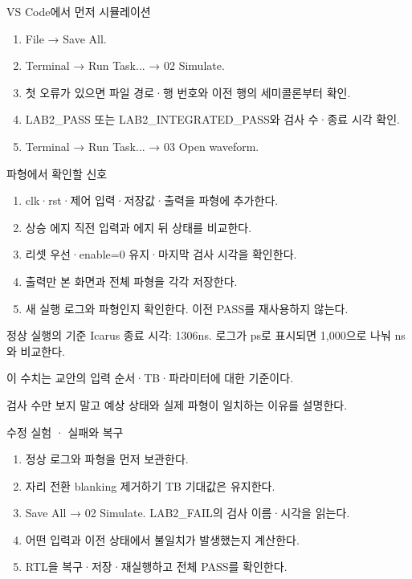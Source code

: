 \begin{frame}[label=simulation]{VS Code에서 먼저 시뮬레이션}
\small
\begin{enumerate}
\item File → Save All.
\item Terminal → Run Task... → 02 Simulate.
\item 첫 오류가 있으면 파일 경로·행 번호와 이전 행의 세미콜론부터 확인.
\item LAB2\_PASS 또는 LAB2\_INTEGRATED\_PASS와 검사 수·종료 시각 확인.
\item Terminal → Run Task... → 03 Open waveform.
\end{enumerate}
\end{frame}

\begin{frame}{파형에서 확인할 신호}
\small
\begin{enumerate}
\item clk·rst·제어 입력·저장값·출력을 파형에 추가한다.
\item 상승 에지 직전 입력과 에지 뒤 상태를 비교한다.
\item 리셋 우선·enable=0 유지·마지막 검사 시각을 확인한다.
\item 출력만 본 화면과 전체 파형을 각각 저장한다.
\item 새 실행 로그와 파형인지 확인한다. 이전 PASS를 재사용하지 않는다.
\end{enumerate}
\end{frame}

\begin{frame}{정상 실행의 기준}
\small
{}Icarus 종료 시각: 1306ns. 로그가 ps로 표시되면 1,000으로 나눠 ns와 비교한다.\par\vspace{0.26cm}이 수치는 교안의 입력 순서·TB·파라미터에 대한 기준이다.\par\vspace{0.26cm}검사 수만 보지 말고 예상 상태와 실제 파형이 일치하는 이유를 설명한다.\par
\end{frame}

\begin{frame}{수정 실험 · 실패와 복구}
\small
\begin{enumerate}
\item 정상 로그와 파형을 먼저 보관한다.
\item 자리 전환 blanking 제거하기 TB 기대값은 유지한다.
\item Save All → 02 Simulate. LAB2\_FAIL의 검사 이름·시각을 읽는다.
\item 어떤 입력과 이전 상태에서 불일치가 발생했는지 계산한다.
\item RTL을 복구·저장·재실행하고 전체 PASS를 확인한다.
\end{enumerate}
\end{frame}

